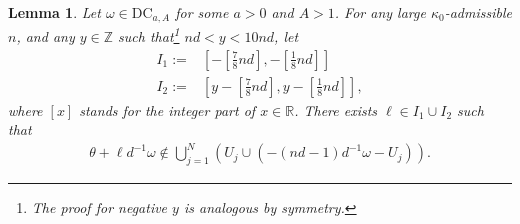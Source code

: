 \documentclass[11pt]{amsart}
\newtheorem{lemma}[theorem]{Lemma}
\newcommand{\Z}{\mathbb Z}
\newcommand{\R}{\mathbb R}
\begin{document}
\begin{lemma}\label{lem:I1_I2}
Let $\omega\in \mathrm{DC}_{a,A}$ for some $a>0$ and $A>1$.
For any large $\kappa_0$-admissible $n$, and any $y\in \Z$ such that\footnote{The proof for negative $y$ is analogous by symmetry.} $nd<y<10nd$, 
let 
\begin{align}
I_1:=&[-[\frac{7}{8}nd], -[\frac{1}{8}nd]]\\
I_2:=&[y-[\frac{7}{8}nd], y-[\frac{1}{8}nd]],
\end{align}
where $[x]$ stands for the integer part of $x\in \R$.
There exists $\ell\in I_1\cup I_2$ such that 
\begin{align*}
\theta+\ell d^{-1} \omega\notin \bigcup_{j=1}^{N} (U_j \cup (-(nd-1)d^{-1}\omega-U_j)).
\end{align*}
\end{lemma}
\end{document}
